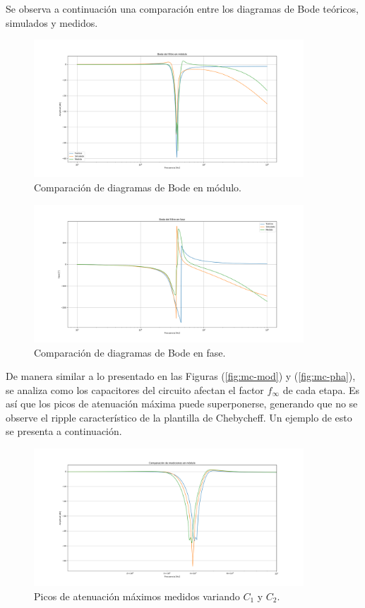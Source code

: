 Se observa a continuación una comparación entre los diagramas de Bode teóricos, simulados y medidos.
\begin{figure}[H]
\centering
	\includegraphics[width=0.9\textwidth]{ImagenesEjercicio4/Bode-Mod-1.png}
	\caption{Comparación de diagramas de Bode en módulo.}
	\label{fig:bode-mod}
\end{figure}
\begin{figure}[H]
\centering
	\includegraphics[width=0.9\textwidth]{ImagenesEjercicio4/Bode-Pha-1.png}
	\caption{Comparación de diagramas de Bode en fase.}
	\label{fig:bode-pha}
\end{figure}

De manera similar a lo presentado en las Figuras (\ref{fig:mc-mod}) y (\ref{fig:mc-pha}), se analiza como los capacitores del circuito afectan el factor $f_\infty$ de cada etapa. Es así que los picos de atenuación máxima puede superponerse, generando que no se observe el ripple característico de la plantilla de Chebycheff. Un ejemplo de esto se presenta a continuación.
\begin{figure}[H]
\centering
	\includegraphics[width=0.9\textwidth]{ImagenesEjercicio4/Bode-Mod-3.png}
	\caption{Picos de atenuación máximos medidos variando $C_1$ y $C_2$.}
	\label{fig:picos}
\end{figure}

